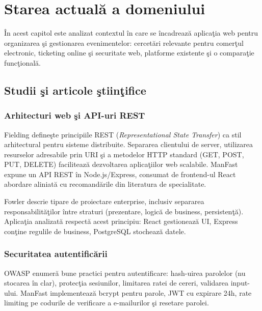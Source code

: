 \chapter{Starea actual\u a a domeniului}
\vspace*{-1cm}
\^In acest capitol este analizat contextul \^in care se \^incadreaz\u a aplica\c tia web pentru organizarea \c si gestionarea evenimentelor: cercet\u ari relevante pentru comer\c tul electronic, ticketing online \c si securitate web, platforme existente \c si o compara\c tie func\c tional\u a.

\section{Studii \c si articole \c stiin\c tifice}

\subsection{Arhitecturi web \c si API-uri REST}

Fielding \cite{fielding2000} define\c ste principiile REST (\textit{Representational State Transfer}) ca stil arhitectural pentru sisteme distribuite. Separarea clientului de server, utilizarea resurselor adresabile prin URI \c si a metodelor HTTP standard (GET, POST, PUT, DELETE) faciliteaz\u a dezvoltarea aplica\c tiilor web scalabile. ManFast expune un API REST \^in Node.js/Express, consumat de frontend-ul React abordare aliniat\u a cu recomand\u arile din literatura de specialitate.

Fowler \cite{fowler2002} descrie tipare de proiectare enterprise, inclusiv separarea responsabilit\u a\c tilor \^intre straturi (prezentare, logic\u a de business, persisten\c t\u a). Aplica\c tia analizat\u a respect\u a acest principiu: React gestioneaz\u a UI, Express con\c tine regulile de business, PostgreSQL stocheaz\u a datele.

\subsection{Securitatea autentific\u arii}

OWASP \cite{owasp2024} enumer\u a bune practici pentru autentificare: hash-uirea parolelor (nu stocarea \^in clar), protec\c tia sesiunilor, limitarea ratei de cereri, validarea input-ului. ManFast implementeaz\u a bcrypt pentru parole, JWT cu expirare 24h, rate limiting pe codurile de verificare a e-mailurilor \c si resetare parolei.

